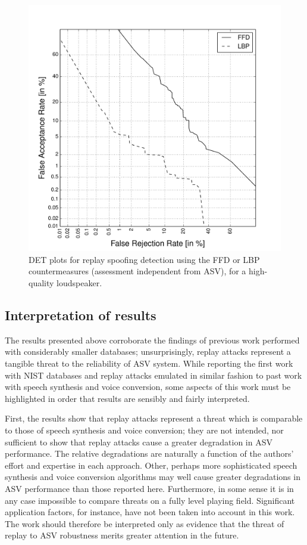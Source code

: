 \begin{figure}
	\centering
\includegraphics[width=1\linewidth]{Figs/DET_CM.pdf}
	\caption{DET plots for replay spoofing detection using the FFD or LBP countermeasures (assessment independent from ASV), for a high-quality loudspeaker.}
	\label{fig::DETs_CM}
\end{figure}



\subsection{Interpretation of results}

The results presented above corroborate the findings of previous work performed with considerably smaller databases; unsurprisingly, replay attacks represent a tangible threat to the reliability of ASV system.  While reporting the first work with NIST databases and replay attacks emulated in similar fashion to past work with speech synthesis and voice conversion, some aspects of this work must be highlighted in order that results are sensibly and fairly interpreted.

First, the results show that replay attacks represent a threat which is comparable to those of speech synthesis and voice conversion; they are not intended, nor sufficient to show that replay attacks cause a greater degradation in ASV performance.  The relative degradations are naturally a function of the authors' effort and expertise in each approach.  Other, perhaps more sophisticated speech synthesis and voice conversion algorithms may well cause greater degradations in ASV performance than those reported here.  Furthermore, in some sense it is in any case impossible to compare threats on a fully level playing field.  Significant application factors, for instance, have not been taken into account in this work.  The work should therefore be interpreted only as evidence that the threat of replay to ASV robustness merits greater attention in the future.

